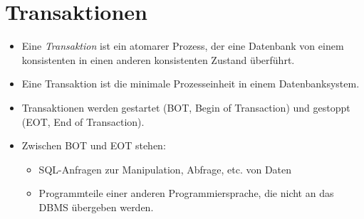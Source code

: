 \documentclass[a4paper, 11pt, accentcolor = tud3b]{tudreport}
\begin{document}
        \section{Transaktionen} %
        	\begin{itemize}
        		\item Eine \textit{Transaktion} ist ein atomarer Prozess, der eine Datenbank von einem konsistenten in einen anderen konsistenten Zustand überführt.
        		\item Eine Transaktion ist die minimale Prozesseinheit in einem Datenbanksystem.
        		\item Transaktionen werden gestartet (BOT, Begin of Transaction) und gestoppt (EOT, End of Transaction).
        		\item Zwischen BOT und EOT stehen:
        			\begin{itemize}
        				\item SQL-Anfragen zur Manipulation, Abfrage, etc. von Daten
        				\item Programmteile einer anderen Programmiersprache, die nicht an das DBMS übergeben werden.
        			\end{itemize}
        	\end{itemize}
\end{document}
